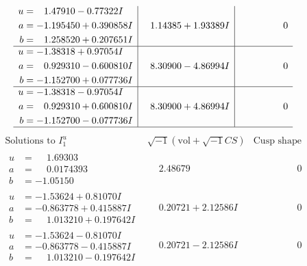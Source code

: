 \documentclass[1p]{elsarticle_modified}
\theoremstyle{definition}
\newcommand{\I}{\sqrt{-1}}
\begin{document}
$$\begin{array}{c|c|c}
\begin{aligned}
u &= \phantom{-}1.47910 - 0.77322 I \\
a &= -1.195450 + 0.390858 I \\
b &= \phantom{-}1.258520 + 0.207651 I\end{aligned}
 & \phantom{-}1.14385 + 1.93389 I & \phantom{-0.000000 } 0 \\ \hline\begin{aligned}
u &= -1.38318 + 0.97054 I \\
a &= \phantom{-}0.929310 - 0.600810 I \\
b &= -1.152700 + 0.077736 I\end{aligned}
 & \phantom{-}8.30900 - 4.86994 I & \phantom{-0.000000 } 0 \\ \hline\begin{aligned}
u &= -1.38318 - 0.97054 I \\
a &= \phantom{-}0.929310 + 0.600810 I \\
b &= -1.152700 - 0.077736 I\end{aligned}
 & \phantom{-}8.30900 + 4.86994 I & \phantom{-0.000000 } 0\\
 \hline 
 \end{array}$$\newpage$$\begin{array}{c|c|c}  
\text{Solutions to }I^u_{1}& \I (\text{vol} + \sqrt{-1}CS) & \text{Cusp shape}\\
 \hline 
\begin{aligned}
u &= \phantom{-}1.69303\phantom{ +0.000000I} \\
a &= \phantom{-}0.0174393\phantom{ +0.000000I} \\
b &= -1.05150\phantom{ +0.000000I}\end{aligned}
 & \phantom{-}2.48679\phantom{ +0.000000I} & \phantom{-0.000000 } 0 \\ \hline\begin{aligned}
u &= -1.53624 + 0.81070 I \\
a &= -0.863778 + 0.415887 I \\
b &= \phantom{-}1.013210 + 0.197642 I\end{aligned}
 & \phantom{-}0.20721 + 2.12586 I & \phantom{-0.000000 } 0 \\ \hline\begin{aligned}
u &= -1.53624 - 0.81070 I \\
a &= -0.863778 - 0.415887 I \\
b &= \phantom{-}1.013210 - 0.197642 I\end{aligned}
 & \phantom{-}0.20721 - 2.12586 I & \phantom{-0.000000 } 0 \\ \hline\begin{aligned}

\end{aligned}
\end{array}$$
\end{document}
